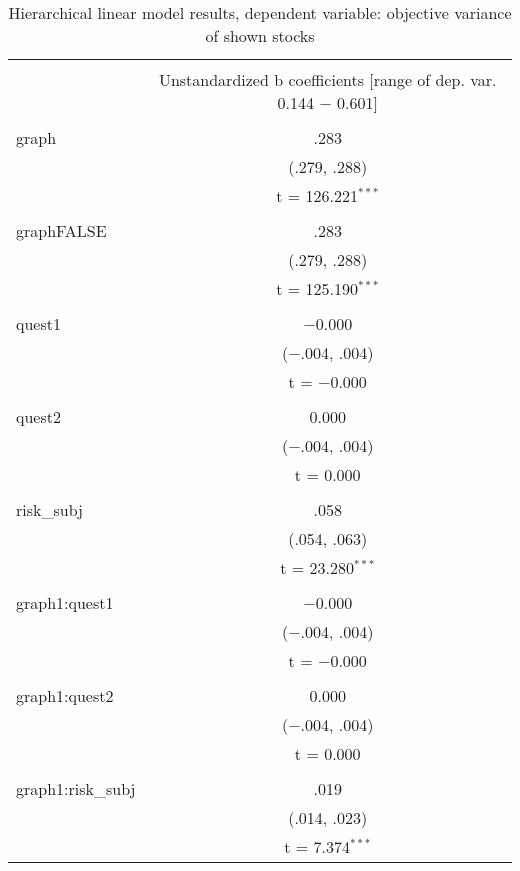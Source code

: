 
\begin{table}[!htbp] \centering 
  \caption{Hierarchical linear model results, dependent variable: objective variance of shown stocks} 
  \label{tab:study1_lm_results} 
\begin{tabular}{@{\extracolsep{5pt}}lc} 
\\[-1.8ex]\hline 
\hline \\[-1.8ex] 
 & \multicolumn{1}{c}{Unstandardized b coefficients [range of dep. var. 0.144 $-$ 0.601]} \\ 
\cline{2-2} 
\hline \\[-1.8ex] 
 graph & .283 \\ 
  & (.279, .288) \\ 
  & t = 126.221$^{***}$ \\ 
  & \\ 
 graphFALSE & .283 \\ 
  & (.279, .288) \\ 
  & t = 125.190$^{***}$ \\ 
  & \\ 
 quest1 & $-$0.000 \\ 
  & ($-$.004, .004) \\ 
  & t = $-$0.000 \\ 
  & \\ 
 quest2 & 0.000 \\ 
  & ($-$.004, .004) \\ 
  & t = 0.000 \\ 
  & \\ 
 risk\_subj & .058 \\ 
  & (.054, .063) \\ 
  & t = 23.280$^{***}$ \\ 
  & \\ 
 graph1:quest1 & $-$0.000 \\ 
  & ($-$.004, .004) \\ 
  & t = $-$0.000 \\ 
  & \\ 
 graph1:quest2 & 0.000 \\ 
  & ($-$.004, .004) \\ 
  & t = 0.000 \\ 
  & \\ 
 graph1:risk\_subj & .019 \\ 
  & (.014, .023) \\ 
  & t = 7.374$^{***}$ \\ 

\end{tabular}
\end{table}
